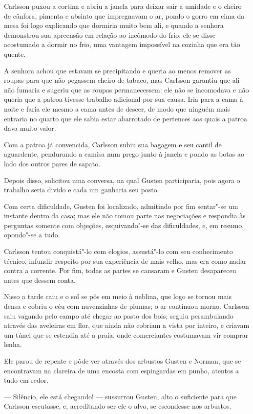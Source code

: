 Carlsson puxou a cortina e abriu a janela para deixar sair a umidade e o cheiro
de cânfora, pimenta e absinto que impregnavam o ar, pondo o gorro em cima da
mesa foi logo explicando que dormiria muito bem ali, e quando a senhora
demonstrou sua apreensão em relação ao incômodo do frio, ele se disse acostumado
a dormir no frio, uma vantagem impossível na cozinha que era tão quente.

A senhora achou que estavam se precipitando e queria ao menos remover as roupas
para que não pegassem cheiro de tabaco, mas Carlsson garantiu que ali não
fumaria e sugeriu que as roupas permanecessem: ele não se incomodava e não
queria que a patroa tivesse trabalho adicional por sua causa. Iria para a cama
à noite e faria ele mesmo a cama antes de descer, de modo que ninguém mais
entraria no quarto que ele sabia estar abarrotado de pertences aos quais a
patroa dava muito valor.

Com a patroa já convencida, Carlsson subiu sua bagagem e seu cantil de
aguardente, pendurando a camisa num prego junto à janela e pondo as botas ao
lado dos outros pares de sapato.

Depois disso, solicitou uma conversa, na qual Gusten participaria, pois agora
o trabalho seria divido e cada um ganharia seu posto.

Com certa dificuldade, Gusten foi localizado, admitindo por fim sentar"-se um
instante dentro da casa; mas ele não tomou parte nas negociações e respondia às
perguntas somente com objeções, esquivando"-se das dificuldades, e, em resumo, 
opondo"-se a tudo.

Carlsson tentou conquistá"-lo com elogios, assustá"-lo com seu conhecimento
técnico, infundir respeito por sua experiência de mais velho, mas era como nadar
contra a corrente. Por fim, todas as partes se cansaram e Gusten desapareceu
antes que dessem conta.

Nisso a tarde caiu e o sol se pôs em meio à neblina, que logo se tornou mais
densa e cobriu o céu com nuvenzinhas de plumas; o ar continuou morno. Carlsson
saiu vagando pelo campo até chegar ao pasto dos bois; seguiu perambulando
através das aveleiras em flor, que ainda não cobriam a vista por inteiro, e 
criavam um túnel que se estendia até a praia, onde comerciantes costumavam vir
comprar lenha.

Ele parou de repente e pôde ver através dos arbustos Gusten e Norman, que se
encontravam na clareira de uma encosta com espingardas em punho, atentos a tudo
em redor.

--- Silêncio, ele está chegando! --- sussurrou Gusten, alto o suficiente para que
Carlsson escutasse, e, acreditando ser ele o alvo, se escondesse nos arbustos.

